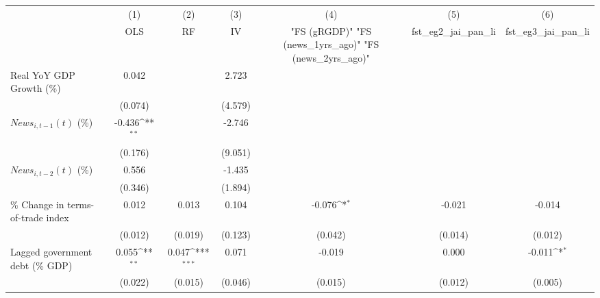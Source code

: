 {
\def\sym#1{\ifmmode^{#1}\else\(^{#1}\)\fi}
\begin{tabular}{l*{6}{c}}
\toprule
                    &\multicolumn{1}{c}{(1)}&\multicolumn{1}{c}{(2)}&\multicolumn{1}{c}{(3)}&\multicolumn{1}{c}{(4)}&\multicolumn{1}{c}{(5)}&\multicolumn{1}{c}{(6)}\\
                    &\multicolumn{1}{c}{OLS}&\multicolumn{1}{c}{RF}&\multicolumn{1}{c}{IV}&\multicolumn{1}{c}{ "FS (gRGDP)"  "FS (news_1yrs_ago)"  "FS (news_2yrs_ago)" }&\multicolumn{1}{c}{fst_eg2_jai_pan_li}&\multicolumn{1}{c}{fst_eg3_jai_pan_li}\\
\midrule
Real YoY GDP Growth (\%)&       0.042         &                     &       2.723         &                     &                     &                     \\
                    &     (0.074)         &                     &     (4.579)         &                     &                     &                     \\
\addlinespace
$ News_{i,t-1}(t)$ (\%)&      -0.436\sym{**} &                     &      -2.746         &                     &                     &                     \\
                    &     (0.176)         &                     &     (9.051)         &                     &                     &                     \\
\addlinespace
$ News_{i,t-2}(t)$ (\%)&       0.556         &                     &      -1.435         &                     &                     &                     \\
                    &     (0.346)         &                     &     (1.894)         &                     &                     &                     \\
\addlinespace
\% Change in terms-of-trade index&       0.012         &       0.013         &       0.104         &      -0.076\sym{*}  &      -0.021         &      -0.014         \\
                    &     (0.012)         &     (0.019)         &     (0.123)         &     (0.042)         &     (0.014)         &     (0.012)         \\
\addlinespace
Lagged government debt (\% GDP)&       0.055\sym{**} &       0.047\sym{***}&       0.071         &      -0.019         &       0.000         &      -0.011\sym{*}  \\
                    &     (0.022)         &     (0.015)         &     (0.046)         &     (0.015)         &     (0.012)         &     (0.005)         \\

\end{tabular}}
